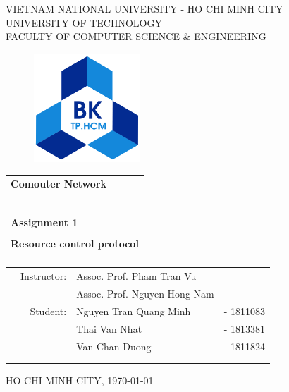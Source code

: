 \documentclass[a4paper,11pt]{extarticle}
\begin{document}
\begin{titlepage}
\begin{center}
VIETNAM NATIONAL UNIVERSITY - HO CHI MINH CITY \\
UNIVERSITY OF TECHNOLOGY \\
FACULTY OF COMPUTER SCIENCE \& ENGINEERING 
\end{center}

\vspace{1cm}

\begin{figure}[h!]
\begin{center}
\includegraphics[width=4cm]{hcmut.png}
\end{center}
\end{figure}

\vspace{1cm}


\begin{center}
\begin{tabular}{c}
\multicolumn{1}{l}{\textbf{{\Large Comouter Network}}}\\
~~\\
\hline
\\
\multicolumn{1}{l}{\textbf{{\Large Assignment 1}}}\\
\\
\textbf{{\Huge Resource control protocol}}\\
\\
\hline
\end{tabular}
\end{center}

\vspace{1cm}

\begin{table}[h]
\begin{tabular}{rrll}
\hspace{3 cm} & Instructor: & Assoc. Prof. Pham Tran Vu\\
              &  & Assoc. Prof. Nguyen Hong Nam\\
 & Student: & Nguyen Tran Quang Minh & - 1811083 \\
 &          & Thai Van Nhat	& - 1813381 \\
 &          & Van Chan Duong & - 1811824\\ 
\\
\vspace{2cm}
\vspace{2cm}
\end{tabular}
\end{table}

\begin{center}
{\footnotesize HO CHI MINH CITY,  \monthyeardate\today}
\end{center}
\end{titlepage}



\newpage
\tableofcontents
\newpage


\end{document}
